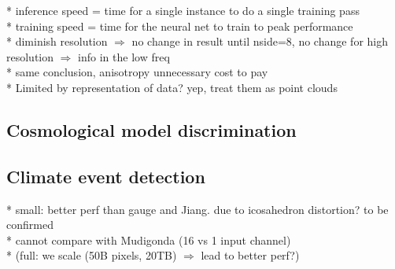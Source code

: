 \documentclass{article} %
\newcommand{\todo}[1]{{\color[rgb]{.6,.1,.6}{#1}}}
\begin{document}
* inference speed = time for a single instance to do a single training pass\\
* training speed = time for the neural net to train to peak performance\\

* diminish resolution $\Rightarrow$ no change in result until nside=8, no change for high resolution $\Rightarrow$ info in the low freq\\
* same conclusion, anisotropy unnecessary cost to pay\\
* Limited by representation of data? yep, treat them as point clouds \\

\subsection{Cosmological model discrimination}

\todo{
* other sphercial CNNs cannot scale to 10M pixels (tested on 10k at most) \\
* redo the experiment with the optimal graph \\
}


\subsection{Climate event detection}

* small: better perf than gauge and Jiang. due to icosahedron distortion? to be confirmed\\
* cannot compare with Mudigonda (16 vs 1 input channel)\\
* (full: we scale (50B pixels, 20TB) $\Rightarrow$ lead to better perf?) \\
\end{document}
